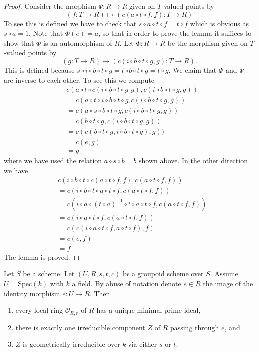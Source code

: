 \begin{proof}
\medskip\noindent
Consider the morphism $\Psi : R \to R$ given on $T$-valued points
by
$$
(f : T \to R) \longmapsto (c(a \circ t \circ f, f) : T \to R)
$$
To see this is defined we have to check that
$s \circ a \circ t \circ f = t \circ f$ which is obvious as $s \circ a = 1$.
Note that $\Phi(e) = a$, so that in order to prove the lemma it
suffices to show that $\Phi$ is an automorphism of $R$.
Let $\Phi : R \to R$ be the morphism given on $T$-valued points by
$$
(g : T \to R) \longmapsto (c(i \circ b \circ t \circ g, g) : T \to R).
$$
This is defined because
$s \circ i \circ b \circ t \circ g = t \circ b \circ t \circ g =
t \circ g$. We claim that $\Phi$ and $\Psi$ are inverse to
each other. To see this we compute
\begin{align*}
& c(a \circ t \circ c(i \circ b \circ t \circ g, g),
c(i \circ b \circ t \circ g, g)) \\
& =
c(a \circ t \circ i \circ b \circ t \circ g,
c(i \circ b \circ t \circ g, g)) \\
& =
c(a \circ s \circ b \circ t \circ g,
c(i \circ b \circ t \circ g, g)) \\
& =
c(b \circ t \circ g, c(i \circ b \circ t \circ g, g)) \\
& =
c(c(b \circ t \circ g, i \circ b \circ t \circ g), g)) \\
& =
c(e, g) \\
& = g
\end{align*}
where we have used the relation $a \circ s \circ b = b$ shown above.
In the other direction we have
\begin{align*}
& c(i \circ b \circ t \circ c(a \circ t \circ f, f), c(a \circ t \circ f, f)) \\
& =
c(i \circ b \circ t \circ a \circ t \circ f, c(a \circ t \circ f, f)) \\
& =
c(i \circ a \circ (t \circ a)^{-1} \circ t \circ a \circ t \circ f,
c(a \circ t \circ f, f)) \\
& =
c(i \circ a \circ t \circ f, c(a \circ t \circ f, f)) \\
& =
c(c(i \circ a \circ t \circ f, a \circ t \circ f), f) \\
& =
c(e, f) \\
& = f
\end{align*}
The lemma is proved.
\end{proof}

\begin{lemma}
\label{lemma-groupoid-on-field-geometrically-irreducible}
Let $S$ be a scheme. Let $(U, R, s, t, c)$ be a groupoid scheme
over $S$. Assume $U = \text{Spec}(k)$ with $k$ a field.
By abuse of notation denote $e \in R$ the image of the identity
morphism $e : U \to R$. Then
\begin{enumerate}
\item every local ring $\mathcal{O}_{R, r}$ of $R$ has a unique
minimal prime ideal,
\item there is exactly one irreducible component $Z$ of $R$
passing through $e$, and
\item $Z$ is geometrically irreducible over $k$ via either
$s$ or $t$.
\end{enumerate}
\end{lemma}


